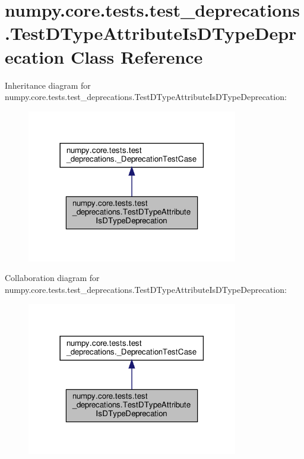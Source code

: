 \hypertarget{classnumpy_1_1core_1_1tests_1_1test__deprecations_1_1TestDTypeAttributeIsDTypeDeprecation}{}\section{numpy.\+core.\+tests.\+test\+\_\+deprecations.\+Test\+D\+Type\+Attribute\+Is\+D\+Type\+Deprecation Class Reference}
\label{classnumpy_1_1core_1_1tests_1_1test__deprecations_1_1TestDTypeAttributeIsDTypeDeprecation}


Inheritance diagram for numpy.\+core.\+tests.\+test\+\_\+deprecations.\+Test\+D\+Type\+Attribute\+Is\+D\+Type\+Deprecation\+:
\nopagebreak
\begin{figure}[H]
\begin{center}
\leavevmode
\includegraphics[width=261pt]{classnumpy_1_1core_1_1tests_1_1test__deprecations_1_1TestDTypeAttributeIsDTypeDeprecation__inherit__graph}
\end{center}
\end{figure}


Collaboration diagram for numpy.\+core.\+tests.\+test\+\_\+deprecations.\+Test\+D\+Type\+Attribute\+Is\+D\+Type\+Deprecation\+:
\nopagebreak
\begin{figure}[H]
\begin{center}
\leavevmode
\includegraphics[width=261pt]{classnumpy_1_1core_1_1tests_1_1test__deprecations_1_1TestDTypeAttributeIsDTypeDeprecation__coll__graph}
\end{center}
\end{figure}
